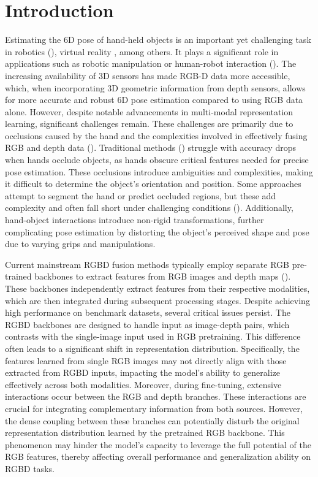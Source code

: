 \section{Introduction}
\label{sec:intro}

Estimating the 6D pose of hand-held objects is an important yet challenging task in robotics (\cite{pfanne2018fusing, anzai2020deep, okafor2024deep}), virtual reality \cite{muhanna2015virtual}, among others. It plays a significant role in applications such as robotic manipulation or human-robot interaction (\cite{andrychowicz2020learning, handa2020dexpilot}). The increasing availability of 3D sensors has made RGB-D data more accessible, which, when incorporating 3D geometric information from depth sensors, allows for more accurate and robust 6D pose estimation compared to using RGB data alone. However, despite notable advancements in multi-modal representation learning, significant challenges remain. These challenges are primarily due to occlusions caused by the hand and the complexities involved in effectively fusing RGB and depth data (\cite{chao2021dexycb}). Traditional methods (\cite{wang20216d, peng2019pvnet, wang2019densefusion, sharma2022saliency}) struggle with accuracy drops when hands occlude objects, as hands obscure critical features needed for precise pose estimation. These occlusions introduce ambiguities and complexities, making it difficult to determine the object's orientation and position. Some approaches attempt to segment the hand or predict occluded regions, but these add complexity and often fall short under challenging conditions (\cite{he2020pvn3d, castro2023crt}). Additionally, hand-object interactions introduce non-rigid transformations, further complicating pose estimation by distorting the object's perceived shape and pose due to varying grips and manipulations.

Current mainstream RGBD fusion methods typically employ separate RGB pre-trained backbones to extract features from RGB images and depth maps (\cite{wang2019densefusion, he2020pvn3d, he2021ffb6d}). These backbones independently extract features from their respective modalities, which are then integrated during subsequent processing stages. Despite achieving high performance on benchmark datasets, several critical issues persist. The RGBD backbones are designed to handle input as image-depth pairs, which contrasts with the single-image input used in RGB pretraining. This difference often leads to a significant shift in representation distribution. Specifically, the features learned from single RGB images may not directly align with those extracted from RGBD inputs, impacting the model's ability to generalize effectively across both modalities. Moreover, during fine-tuning, extensive interactions occur between the RGB and depth branches. These interactions are crucial for integrating complementary information from both sources. However, the dense coupling between these branches can potentially disturb the original representation distribution learned by the pretrained RGB backbone. This phenomenon may hinder the model's capacity to leverage the full potential of the RGB features, thereby affecting overall performance and generalization ability on RGBD tasks.

